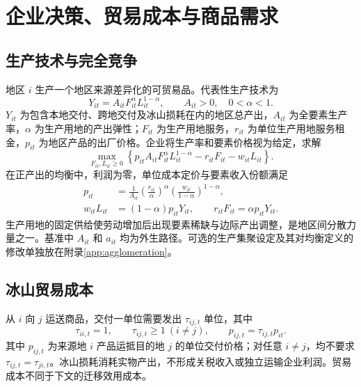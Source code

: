 \documentclass[UTF8,a4paper,zihao=-4,fontset=windows]{ctexart}
\numberwithin{equation}{section}
\begin{document}
\section{企业决策、贸易成本与商品需求}
\label{sec:firms-trade}

\subsection{生产技术与完全竞争}
地区 $i$ 生产一个地区来源差异化的可贸易品。代表性生产技术为
\begin{equation}
  Y_{it}=A_{it}F_{it}^{\alpha}L_{it}^{1-\alpha},
  \qquad A_{it}>0,\quad 0<\alpha<1.
  \label{eq:production}
\end{equation}
$Y_{it}$ 为包含本地交付、跨地交付及冰山损耗在内的地区总产出，$A_{it}$ 为全要素生产率，$\alpha$ 为生产用地的产出弹性；$F_{it}$ 为生产用地服务，$r_{it}$ 为单位生产用地服务租金，$p_{it}$ 为地区产品的出厂价格。企业将生产率和要素价格视为给定，求解
\begin{equation}
  \max_{F_{it},L_{it}\geq0}
  \left\{p_{it}A_{it}F_{it}^{\alpha}L_{it}^{1-\alpha}
      -r_{it}F_{it}-w_{it}L_{it}\right\}.
  \label{eq:firm-problem}
\end{equation}
在正产出的均衡中，利润为零，单位成本定价与要素收入份额满足
\begin{align}
  p_{it}&=\frac{1}{A_{it}}
    \left(\frac{r_{it}}{\alpha}\right)^{\alpha}
    \left(\frac{w_{it}}{1-\alpha}\right)^{1-\alpha},
    \label{eq:unit-cost}\\
  w_{it}L_{it}&=(1-\alpha)p_{it}Y_{it},\qquad
  r_{it}F_{it}=\alpha p_{it}Y_{it}.
  \label{eq:factor-payments}
\end{align}
生产用地的固定供给使劳动增加后出现要素稀缺与边际产出调整，是地区间分散力量之一。基准中 $A_{it}$ 和 $a_{it}$ 均为外生路径。可选的生产集聚设定及其对均衡定义的修改单独放在附录\ref{app:agglomeration}。

\subsection{冰山贸易成本}
从 $i$ 向 $j$ 运送商品，交付一单位需要发出 $\tau_{ij,t}$ 单位，其中
\begin{equation}
  \tau_{ii,t}=1,\qquad \tau_{ij,t}\geq1\ (i\ne j),\qquad
  p_{ij,t}=\tau_{ij,t}p_{it}.
  \label{eq:iceberg}
\end{equation}
其中 $p_{ij,t}$ 为来源地 $i$ 产品运抵目的地 $j$ 的单位交付价格；对任意 $i\ne j$，均不要求 $\tau_{ij,t}=\tau_{ji,t}$。冰山损耗消耗实物产出，不形成关税收入或独立运输企业利润。贸易成本不同于下文的迁移效用成本。
\end{document}
